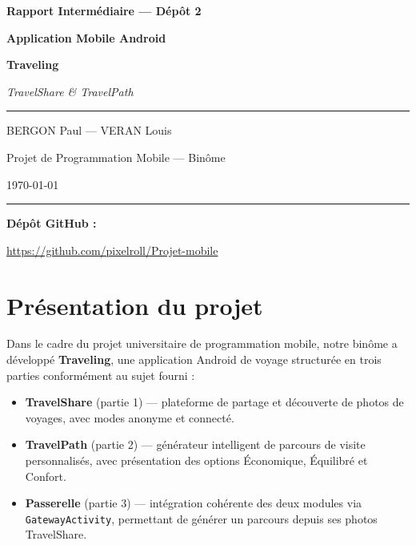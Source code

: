 \documentclass[a4paper,11pt]{article}
\begin{document}

\begin{titlepage}
    \centering
    \vspace*{2cm}
    {\Large\textbf{Rapport Intermédiaire — Dépôt 2}\par}
    \vspace{0.5cm}
    {\LARGE\bfseries\color{teal} Application Mobile Android\par}
    \vspace{0.3cm}
    {\LARGE\bfseries Traveling\par}
    \vspace{0.5cm}
    {\large\itshape TravelShare \& TravelPath\par}
    \vspace{2cm}
    \rule{0.5\textwidth}{0.4pt}\par
    \vspace{0.8cm}
    {\large BERGON Paul \quad — \quad VERAN Louis\par}
    \vspace{0.3cm}
    {\normalsize Projet de Programmation Mobile — Binôme\par}
    \vspace{0.3cm}
    {\normalsize\today\par}
    \vspace{2cm}
    \rule{0.5\textwidth}{0.4pt}\par
    \vspace{0.8cm}
    {\normalsize\textbf{Dépôt GitHub :}\par}
    \vspace{0.2cm}
    {\normalsize\url{https://github.com/pixelroll/Projet-mobile}\par}
\end{titlepage}

\tableofcontents
\newpage

\section{Présentation du projet}

Dans le cadre du projet universitaire de programmation mobile, notre binôme a développé \textbf{Traveling}, une application Android de voyage structurée en trois parties conformément au sujet fourni :

\begin{itemize}[leftmargin=1.5em, itemsep=3pt]
    \item \textbf{TravelShare} (partie 1) — plateforme de partage et découverte de photos de voyages, avec modes anonyme et connecté.
    \item \textbf{TravelPath} (partie 2) — générateur intelligent de parcours de visite personnalisés, avec présentation des options Économique, Équilibré et Confort.
    \item \textbf{Passerelle} (partie 3) — intégration cohérente des deux modules via \texttt{GatewayActivity}, permettant de générer un parcours depuis ses photos TravelShare.
\end{itemize}
\end{document}
